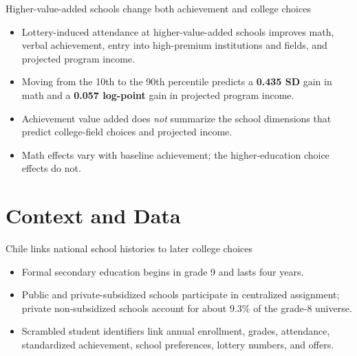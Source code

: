 \documentclass[11pt,aspectratio=169]{beamer}
\newcommand{\key}[1]{\textcolor{mDarkTeal}{\textbf{#1}}}
\newenvironment{wideitemize}{%
  \begin{minipage}{0.92\textwidth}
  \begin{itemize}
  \addtolength{\itemsep}{0.85em}
}{%
  \end{itemize}
  \end{minipage}
}
\begin{document}
\begin{frame}{Higher-value-added schools change both achievement and college choices}
\begin{wideitemize}
  \item Lottery-induced attendance at higher-value-added schools improves math, verbal achievement, entry into high-premium institutions and fields, and projected program income.

  \item Moving from the 10th to the 90th percentile predicts a \key{0.435 SD} gain in math and a \key{0.057 log-point} gain in projected program income.

  \item Achievement value added does \textit{not} summarize the school dimensions that predict college-field choices and projected income.

  \item Math effects vary with baseline achievement; the higher-education choice effects do not.
\end{wideitemize}
\end{frame}


\section{Context and Data}

\begin{frame}{Chile links national school histories to later college choices}
\begin{wideitemize}
  \item Formal secondary education begins in grade 9 and lasts four years.

  \item Public and private-subsidized schools participate in centralized assignment; private non-subsidized schools account for about 9.3\% of the grade-8 universe.

  \item Scrambled student identifiers link annual enrollment, grades, attendance, standardized achievement, school preferences, lottery numbers, and offers.
\end{wideitemize}
\end{frame}
\end{document}
